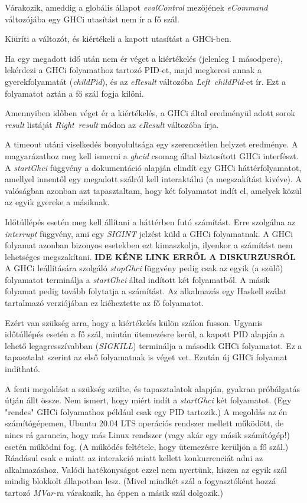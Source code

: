 \begin{compactenum}
	\item Várakozik, ameddig a globális állapot \textit{evalControl} mezőjének \textit{eCommand} változójába egy GHCi utasítást nem ír a fő szál.
	\item Kiüríti a változót, és kiértékeli a kapott utasítást a GHCi-ben.
	\item Ha egy megadott idő után nem ér véget a kiértékelés (jelenleg 1 másodperc), lekérdezi a GHCi folyamathoz tartozó PID-et, majd megkeresi annak a gyerekfolyamatát (\textit{childPid}), és az \textit{eResult} változóba \textit{Left\ childPid}-et ír. Ezt a folyamatot aztán a fő szál fogja kilőni.
	\item Amennyiben időben véget ér a kiértékelés, a GHCi által eredményül adott sorok \textit{result} listáját \textit{Right\ result} módon az \textit{eResult} változóba írja.
\end{compactenum}

A timeout utáni viselkedés bonyolultsága egy szerencsétlen helyzet eredménye. A magyarázathoz meg kell ismerni a \textit{ghcid} csomag által biztosított GHCi interfészt. A \textit{startGhci} függvény a dokumentáció alapján elindít egy GHCi háttérfolyamatot, amellyel innentől egy megadott szálról kell interaktálni (a megszakítást kivéve). A valóságban azonban azt tapasztaltam, hogy két folyamatot indít el, amelyek közül az egyik gyereke a másiknak. 

Időtúllépés esetén meg kell állítani a háttérben futó számítást. Erre szolgálna az \textit{interrupt} függvény, ami egy \textit{SIGINT} jelzést küld a GHCi folyamatnak. A GHCi folyamat azonban bizonyos esetekben ezt kimaszkolja, ilyenkor a számítást nem lehetséges megszakítani. \textbf{IDE KÉNE LINK ERRŐL A DISKURZUSRÓL} A GHCi leállítására szolgáló \textit{stopGhci} függvény pedig csak  az egyik (a szülő) folyamatot terminálja a \textit{startGhci} által indított két folyamatból. A másik folyamat pedig tovább folytatja a számítást. Az alkalmazás egy Haskell szálat tartalmazó verziójában ez kiéheztette az fő folyamatot. 

Ezért van szükség arra, hogy a kiértékelés külön szálon fusson. Ugyanis időtúllépés esetén a fő szál, miután ütemezésre kerül, a kapott PID alapján a lehető legagresszívabban (\textit{SIGKILL}) terminálja a második GHCi folyamatot. Ez a tapasztalat szerint az első folyamatnak is véget vet. Ezután új GHCi folyamat indítható.

A fenti megoldást a szükség szülte, és tapasztalatok alapján, gyakran próbálgatás útján állt össze. Nem ismert, hogy miért indít a \textit{startGhci} két folyamatot. (Egy "rendes" GHCi folyamathoz például csak egy PID tartozik.) A megoldás az én számítógépemen, Ubuntu 20.04 LTS operációs rendszer mellett működött, de nincs rá garancia, hogy más Linux rendszer (vagy akár egy másik számítógép!) esetén működni fog. (A működés feltétele, hogy ütemezésre kerüljön a fő szál.) Ráadásul csak e miatt az interakció miatt kellett konkurrenciát adni az alkalmazáshoz. Valódi hatékonyságot ezzel nem nyertünk, hiszen az egyik szál mindig blokkolt állapotban lesz. (Mivel mindkét szál a fogyasztóként hozzá tartozó \textit{MVar}-ra várakozik, ha éppen a másik szál dolgozik.)

